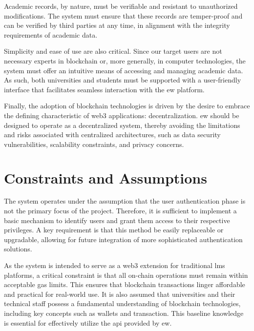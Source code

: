 Academic records, by nature, must be verifiable and resistant to unauthorized modifications. The system must ensure that these records are temper-proof and can be verified by third parties at any time, in alignment with the integrity requirements of academic data.

Simplicity and ease of use are also critical. Since our target users are not necessary experts in blockchain or, more generally, in computer technologies, the system must offer an intuitive means of accessing and managing academic data. As such, both universities and students must be supported with a user-friendly interface that facilitates seamless interaction with the \acrshort{ew} platform.

Finally, the adoption of blockchain technologies is driven by the desire to embrace the defining characteristic of \Gls{web3} applications: decentralization. \acrshort{ew} should be designed to operate as a decentralized system, thereby avoiding the limitations and risks associated with centralized architectures, such as data security vulnerabilities, scalability constraints, and privacy concerns. %


\section{Constraints and Assumptions}
The system operates under the assumption that the user authentication phase is not the primary focus of the project. Therefore, it is sufficient to implement a basic mechanism to identify users and grant them access to their respective privileges. A key requirement is that this method be easily replaceable or upgradable, allowing for future integration of more sophisticated authentication solutions.

As the system is intended to serve as a \Gls{web3} extension for traditional \acrshort{lms} platforms, a critical constraint is that all on-chain operations must remain within acceptable gas limits. This ensures that blockchain transactions linger affordable and practical for real-world use. It is also assumed that universities and their technical staff possess a fundamental understanding of blockchain technologies, including key concepts such as wallets and transaction. This baseline knowledge is essential for effectively utilize the \acrshort{api} provided by \acrshort{ew}.